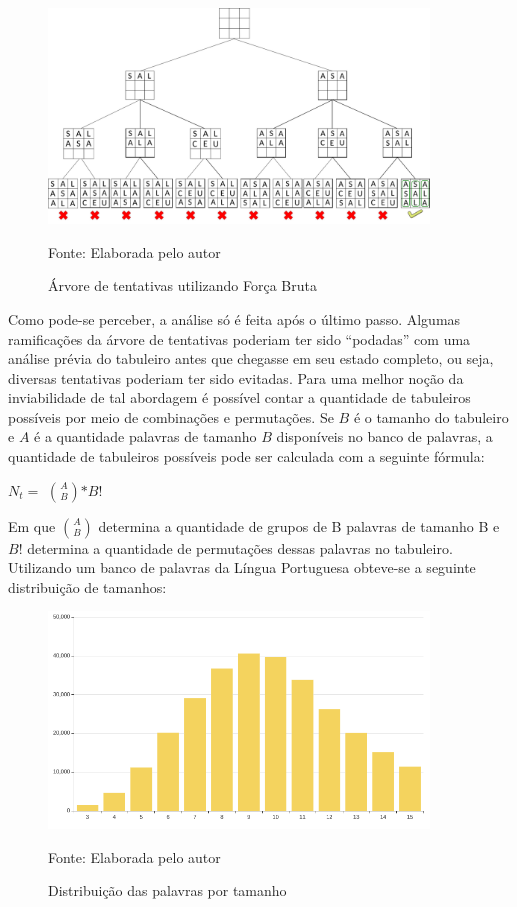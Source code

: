 \begin{figure}[H]
\centering
    \caption{Árvore de tentativas utilizando Força Bruta}
    \label{fig:crossTree}
    \includegraphics[width=0.9\textwidth]{Figuras/crosswordsTree.png}
    
    Fonte: Elaborada pelo autor
\end{figure}

Como pode-se perceber, a análise só é feita após o último passo. Algumas ramificações da árvore de tentativas poderiam ter sido ``podadas'' com uma análise prévia do tabuleiro antes que chegasse em seu estado completo, ou seja, diversas tentativas poderiam ter sido evitadas. 
Para uma melhor noção da inviabilidade de tal abordagem é possível contar a quantidade de tabuleiros possíveis por meio de combinações e permutações.
Se $B$ é o tamanho do tabuleiro e $A$ é a quantidade palavras de tamanho $B$ disponíveis no banco de palavras, a quantidade de tabuleiros possíveis pode ser calculada com a seguinte fórmula: 
\begin{center}
\Large{$N_{t} =$ $A \choose{B}$$*B!$} 
\label{qtdtab}
\end{center}

Em que $A \choose{B}$ determina a quantidade de grupos de B palavras de tamanho B e $B!$ determina a quantidade de permutações dessas palavras no tabuleiro. Utilizando um banco de palavras da Língua Portuguesa obteve-se a seguinte distribuição de tamanhos:

\begin{figure}[H]
\centering
    \caption{Distribuição das palavras por tamanho}
    \label{fig:distTam}
    \includegraphics[width=0.9\textwidth]{Figuras/distribuicaoPorTamanho.png}
    
    Fonte: Elaborada pelo autor
\end{figure}


